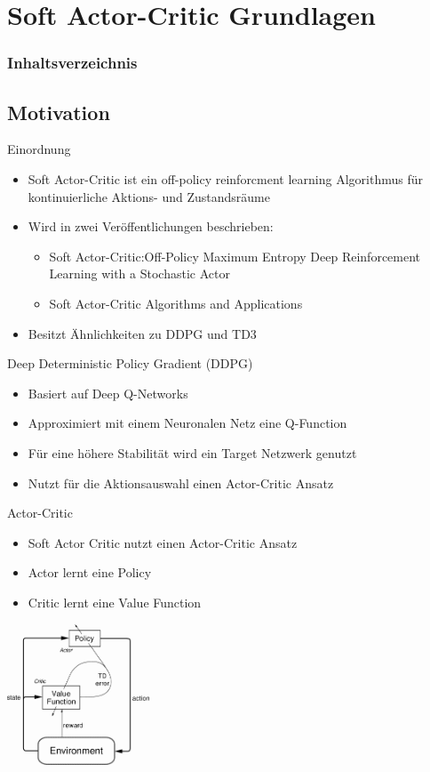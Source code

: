 \section{Soft Actor-Critic Grundlagen}
\begin{frame}
    \frametitle{Inhaltsverzeichnis}
    \tableofcontents[currentsection]
\end{frame}

\subsection{Motivation}
\begin{frame}{Einordnung}
	\begin{itemize}
		\item Soft Actor-Critic ist ein off-policy reinforcment learning Algorithmus für kontinuierliche Aktions- und Zustandsräume 
		\item Wird in zwei Veröffentlichungen beschrieben:
		\begin{itemize}
			\item Soft Actor-Critic:Off-Policy Maximum Entropy Deep Reinforcement Learning with a Stochastic Actor
			\item Soft Actor-Critic Algorithms and Applications
		\end{itemize}
		\item Besitzt Ähnlichkeiten zu DDPG und TD3 
	\end{itemize} 
\end{frame}

\begin{frame}{Deep Deterministic Policy Gradient (DDPG)}
	\begin{itemize}
		\item Basiert auf Deep Q-Networks
		\item Approximiert mit einem Neuronalen Netz eine Q-Function
		\item Für eine höhere Stabilität wird ein Target Netzwerk genutzt
		\item Nutzt für die Aktionsauswahl einen Actor-Critic Ansatz
	\end{itemize} 
\end{frame}

\begin{frame}{Actor-Critic}
	\begin{itemize}
		\item Soft Actor Critic nutzt einen Actor-Critic Ansatz
		\item Actor lernt eine Policy
		\item Critic lernt eine Value Function
	\end{itemize} 
	\includegraphics[width=120pt]{figures/figtmp34.png}
	\cite{actorcritic}
\end{frame}

